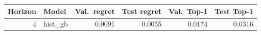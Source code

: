 \begin{tabular}{@{}r l r r r r@{}}
\toprule
Horizon & Model & Val.\ regret & Test regret & Val.\ Top-1 & Test Top-1 \\
\midrule
4 & hist\_gb & 0.0091 & 0.0055 & 0.0174 & 0.0316 \\
\bottomrule
\end{tabular}
